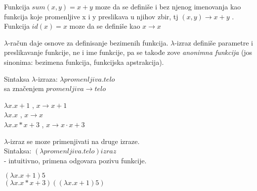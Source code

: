 \documentclass[../main.tex]{subfiles}
\begin{document}
	   \begin{boxprimer}
	   Funkcija $sum(x,y)=x+y$ moze da se definiše i bez njenog imenovanja kao funkcija koje promenljive x i y preslikava u njihov zbir, tj $(x,y)\rightarrow x+y$ .\\
	   Funkcija $id(x)=x$ moze da se definiše kao $x \rightarrow x$
	   \end{boxprimer}
	   
	   $\lambda$-račun daje osnove za definisanje bezimenih funkcija. $\lambda$-izraz definiše parametre i preslikavanje funkcije, ne i ime funkcije, pa se takođe zove {\it anonimna funkcija} (jos sinonima: bezimena funkcija, funkcijska apstrakcija). 
	   

\begin{multicols}{2}
Sintaksa $\lambda$-izraza: 
$\lambda promenljiva.telo$ \\
sa značenjem $promenljiva \rightarrow telo$

\columnbreak

\begin{boxprimer}
$\lambda x.x + 1$    \hspace{0.5cm}, $x \rightarrow x + 1$ \\
$\lambda x.x $  \hspace{1cm} , $x\rightarrow x$ \\
$\lambda x.x * x + 3$ , $x \rightarrow x \cdot x + 3$
\end{boxprimer}
\end{multicols}

\begin{multicols}{2}

$\lambda$-izraz se moze primenjivati na druge izraze.\\
Sintaksa: $(\lambda promenljiva.telo)izraz $\\
- intuitivno, primena odgovara pozivu funkcije.

\columnbreak
\begin{boxprimer}
$(\lambda x.x + 1)5$ \\
$(\lambda x.x*x+3)((\lambda x.x + 1)5)$
\end{boxprimer}

\end{multicols}
\end{document}
